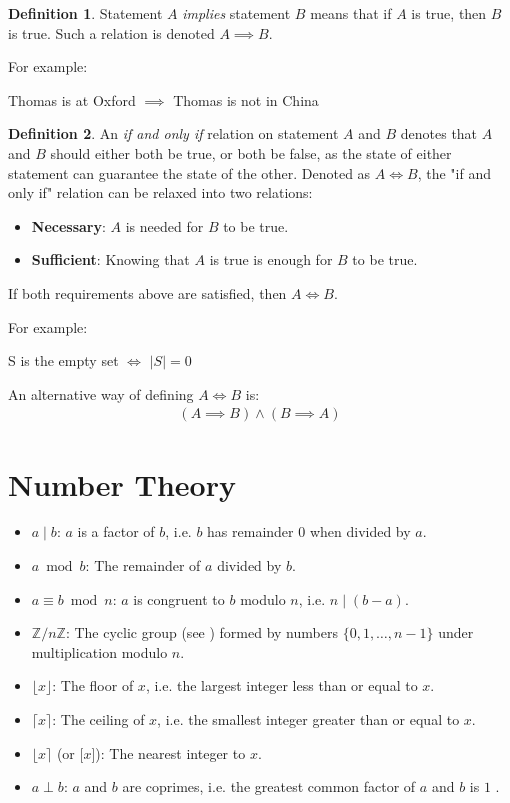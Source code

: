 \documentclass[12pt]{article}
\theoremstyle{definition}
\newtheorem{defn}{Definition}[section]
\newcommand{\bras}[1]{\lbrace #1 \rbrace}
\begin{document}
 	\begin{defn}
 		Statement $A$ \emph{implies} statement $B$ means that if $A$ is true, then $B$ is true. Such a relation is denoted $A \implies B$.
  	\end{defn}
  	
  	For example:
  	\begin{center}
  		Thomas is at Oxford $\implies$ Thomas is not in China
  	\end{center}
  	
  	\begin{defn}
  		An \emph{if and only if} relation on statement $A$ and $B$ denotes that $A$ and $B$ should either both be true, or  both be false, as the state of either statement can guarantee the state of the other. Denoted as $A \iff B$, the "if and only if" relation can be relaxed into two relations:
  		\begin{itemize}
  			\item \textbf{Necessary}: $A$ is needed for $B$ to be true.
  			\item \textbf{Sufficient}: Knowing that $A$ is true is enough for $B$ to be true.
  		\end{itemize}
  		If both requirements above are satisfied, then $A \iff B$.
  	\end{defn}
  	
  	For example:
  	\begin{center}
  		S is the empty set $\iff$ $|S| = 0$
  	\end{center}
  	
  	An alternative way of defining $A \iff B$ is:
  	\begin{gather*}
  		(A \implies B) \land (B \implies A)
  	\end{gather*}
 	
 	\section{Number Theory}
 	
 	\begin{itemize}
 		\item $a \mid b$: $a$ is a factor of $b$, i.e. $b$ has remainder $0$ when divided by $a$.
 		\item $a \bmod b$: The remainder of $a$ divided by $b$.
 		\item $a \equiv b \bmod n$: $a$ is congruent to $b$ modulo $n$, i.e. $n \mid (b - a)$.
 		\item $\mathbb{Z}/n\mathbb{Z}$: The cyclic group (see ) formed by numbers $\bras{0, 1, \dots, n - 1}$ under multiplication modulo $n$.
 		\item $\lfloor x \rfloor$: The floor of $x$, i.e. the largest integer less than or equal to $x$.
 		\item $\lceil x \rceil$: The ceiling of $x$, i.e. the smallest integer greater than or equal to $x$.
 		\item $\lfloor x \rceil$ (or $\lbrack x \rbrack$): The nearest integer to $x$.
 		\item $a \perp b$: $a$ and $b$ are coprimes, i.e. the greatest common factor of $a$ and $b$ is $1$
. 	\end{itemize}
 	
\end{document}
